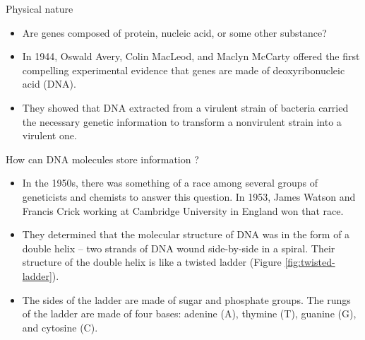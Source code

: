 \documentclass[11pt,dvipsnames,ignorenonframetext,aspectratio=169]{beamer}
\providecommand{\tightlist}{%
  \setlength{\itemsep}{0pt}\setlength{\parskip}{0pt}}
\begin{document}
\begin{frame}{Physical nature}
\protect\hypertarget{physical-nature}{}
\begin{itemize}
\tightlist
\item
  Are genes composed of protein, nucleic acid, or some other substance?
\item
  In 1944, Oswald Avery, Colin MacLeod, and Maclyn McCarty offered the
  first compelling experimental evidence that genes are made of
  deoxyribonucleic acid (DNA).
\item
  They showed that DNA extracted from a virulent strain of bacteria
  carried the necessary genetic information to transform a nonvirulent
  strain into a virulent one.
\end{itemize}
\end{frame}

\begin{frame}{How can DNA molecules store information ?}
\protect\hypertarget{how-can-dna-molecules-store-information}{}
\begin{itemize}
\tightlist
\item
  In the 1950s, there was something of a race among several groups of
  geneticists and chemists to answer this question. In 1953, James
  Watson and Francis Crick working at Cambridge University in England
  won that race.
\item
  They determined that the molecular structure of DNA was in the form of
  a double helix -- two strands of DNA wound side-by-side in a spiral.
  Their structure of the double helix is like a twisted ladder (Figure
  \ref{fig:twisted-ladder}).
\item
  The sides of the ladder are made of sugar and phosphate groups. The
  rungs of the ladder are made of four bases: adenine (A), thymine (T),
  guanine (G), and cytosine (C).
\end{itemize}
\end{frame}
\end{document}
